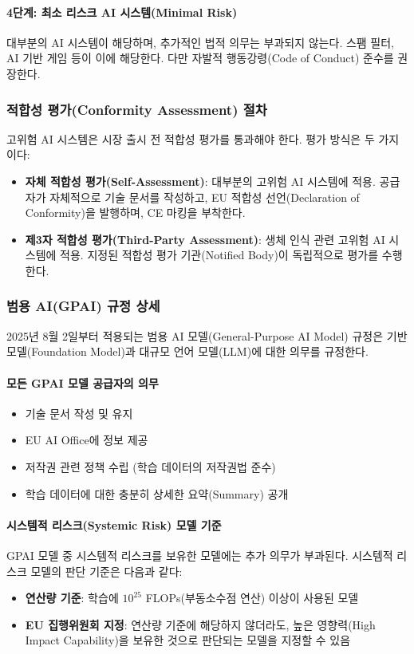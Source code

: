 \paragraph{4단계: 최소 리스크 AI 시스템(Minimal Risk)}
대부분의 AI 시스템이 해당하며, 추가적인 법적 의무는 부과되지 않는다. 스팸 필터, AI 기반 게임 등이 이에 해당한다. 다만 자발적 행동강령(Code of Conduct) 준수를 권장한다.

\subsubsection{적합성 평가(Conformity Assessment) 절차}

고위험 AI 시스템은 시장 출시 전 적합성 평가를 통과해야 한다. 평가 방식은 두 가지이다:

\begin{itemize}
 \item \textbf{자체 적합성 평가(Self-Assessment)}: 대부분의 고위험 AI 시스템에 적용. 공급자가 자체적으로 기술 문서를 작성하고, EU 적합성 선언(Declaration of Conformity)을 발행하며, CE 마킹을 부착한다.
 \item \textbf{제3자 적합성 평가(Third-Party Assessment)}: 생체 인식 관련 고위험 AI 시스템에 적용. 지정된 적합성 평가 기관(Notified Body)이 독립적으로 평가를 수행한다.
\end{itemize}

\subsubsection{범용 AI(GPAI) 규정 상세}

2025년 8월 2일부터 적용되는 범용 AI 모델(General-Purpose AI Model) 규정은 기반 모델(Foundation Model)과 대규모 언어 모델(LLM)에 대한 의무를 규정한다.

\paragraph{모든 GPAI 모델 공급자의 의무}
\begin{itemize}
 \item 기술 문서 작성 및 유지
 \item EU AI Office에 정보 제공
 \item 저작권 관련 정책 수립 (학습 데이터의 저작권법 준수)
 \item 학습 데이터에 대한 충분히 상세한 요약(Summary) 공개
\end{itemize}

\paragraph{시스템적 리스크(Systemic Risk) 모델 기준}
GPAI 모델 중 시스템적 리스크를 보유한 모델에는 추가 의무가 부과된다. 시스템적 리스크 모델의 판단 기준은 다음과 같다:
\begin{itemize}
 \item \textbf{연산량 기준}: 학습에 $10^{25}$ FLOPs(부동소수점 연산) 이상이 사용된 모델
 \item \textbf{EU 집행위원회 지정}: 연산량 기준에 해당하지 않더라도, 높은 영향력(High Impact Capability)을 보유한 것으로 판단되는 모델을 지정할 수 있음
\end{itemize}

